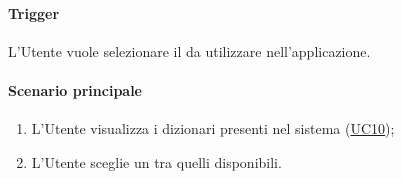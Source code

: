 \paragraph*{Trigger}
L'Utente vuole selezionare il  da utilizzare nell'applicazione.

\paragraph*{Scenario principale}
\begin{enumerate}
  \item L'Utente visualizza i dizionari presenti nel sistema (\hyperref[UC10]{UC10});
  \item L'Utente sceglie un  tra quelli disponibili.
\end{enumerate}

